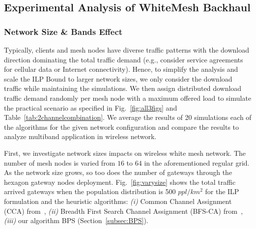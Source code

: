 \subsection{Experimental Analysis of WhiteMesh Backhaul}
\label{subsec:analysis}

\subsubsection{Network Size \& Bands Effect}

%
%




Typically, clients and mesh nodes have diverse traffic patterns with
the download direction dominating the total traffic demand (e.g., consider
service agreements for cellular data or Internet connectivity). Hence, to
simplify the analysis and scale the ILP Bound to larger network sizes, we 
only consider the download traffic while maintaining the simulations.
We then assign distributed download traffic demand randomly per 
mesh node with a maximum offered load to simulate the practical scenario 
as specified in Fig.~\ref{fig:all3figs} and Table~\ref{tab:2channelcombination}. 
We average the results of 20 simulations each of the algorithms for the 
given network configuration and compare the results to analyze multiband 
application in wireless network.

First, we investigate network sizes impacts on wireless white mesh network. 
The number of mesh nodes is varied from $16$ to $64$ in the aforementioned 
regular grid. As the network size grows, so too does the number of gateways
through the hexagon gateway nodes deployment. 
Fig.~\ref{fig:varysize} shows the total traffic arrived gateways when the 
population distribution is 500 $ppl/km^2$ for the ILP formulation and 
the heuristic algorithms: 
{\it (i)} Common Channel Assignment (CCA) from~\cite{draves2004routing},
{\it (ii)} Breadth First Search Channel Assignment (BFS-CA) from~\cite{ramachandran2006interference},
{\it (iii)} our algorithm BPS (Section~\ref{subsec:BPS}).


